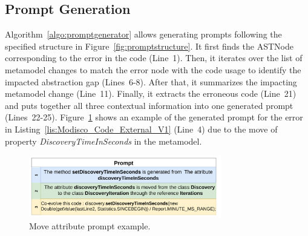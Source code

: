
\subsection{Prompt Generation}
\label{promptgeneration}

Algorithm~\ref{algo:promptgenerator} allows generating prompts following the specified structure in Figure~\ref{fig:promptstructure}. It first finds the ASTNode corresponding to the error in the code (Line~1). Then, it iterates over the list of metamodel changes to match  the error node with the code usage to identify the impacted abstraction gap (Lines~6-8). After that, it summarizes the impacting metamodel change (Line~11). Finally, it extracts the erroneous code (Line~21) and puts together all three contextual information into one generated prompt (Lines~22-25). 
%
Figure~\ref{fig:promptexample} shows an example of the generated prompt for the error in Listing~\ref{lis:Modisco_Code_External_V1} (Line~4) due to the move of property \emph{DiscoveryTimeInSeconds} in the metamodel.  

\begin{figure}[t]
	\centering
	\includegraphics[width=0.75\textwidth]{./pics/chapter3pics/PromptStructure.png}
	\caption{Move attribute prompt example.}
	\label{fig:promptexample}
	\vspace{-5mm}
\end{figure}


